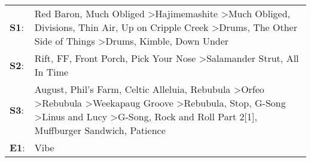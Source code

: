 \begin{supertabular}{p{0.03\textwidth}p{0.92\textwidth}}
 \textbf{S1}:  &                                                                                                                                          Red Baron\textsuperscript{}, \enspace Much Obliged\textsuperscript{} \textgreater \enspace Hajimemashite\textsuperscript{} \textgreater \enspace Much Obliged\textsuperscript{}, \enspace Divisions\textsuperscript{}, \enspace Thin Air\textsuperscript{}, \enspace Up on Cripple Creek\textsuperscript{} \textgreater \enspace Drums\textsuperscript{}, \enspace The Other Side of Things\textsuperscript{} \textgreater \enspace Drums\textsuperscript{}, \enspace Kimble\textsuperscript{}, \enspace Down Under\textsuperscript{}  \enspace  \\
 \textbf{S2}:  &                                                                                                                                                                                                                                                                                                                                                                                                                                      Rift\textsuperscript{}, \enspace FF\textsuperscript{}, \enspace Front Porch\textsuperscript{}, \enspace Pick Your Nose\textsuperscript{} \textgreater \enspace Salamander Strut\textsuperscript{}, \enspace All In Time\textsuperscript{}  \enspace  \\
 \textbf{S3}:  &  August\textsuperscript{}, \enspace Phil's Farm\textsuperscript{}, \enspace Celtic Alleluia\textsuperscript{}, \enspace Rebubula\textsuperscript{} \textgreater \enspace Orfeo\textsuperscript{} \textgreater \enspace Rebubula\textsuperscript{} \textgreater \enspace Weekapaug Groove\textsuperscript{} \textgreater \enspace Rebubula\textsuperscript{}, \enspace Stop\textsuperscript{}, \enspace G-Song\textsuperscript{} \textgreater \enspace Linus and Lucy\textsuperscript{} \textgreater \enspace G-Song\textsuperscript{}, \enspace Rock and Roll Part 2[1]\textsuperscript{}, \enspace Muffburger Sandwich\textsuperscript{}, \enspace Patience\textsuperscript{}  \enspace  \\
 \textbf{E1}:  &                                                                                                                                                                                                                                                                                                                                                                                                                                                                                                                                                                                                                                                         Vibe\textsuperscript{}  \enspace  \\
\end{supertabular}
